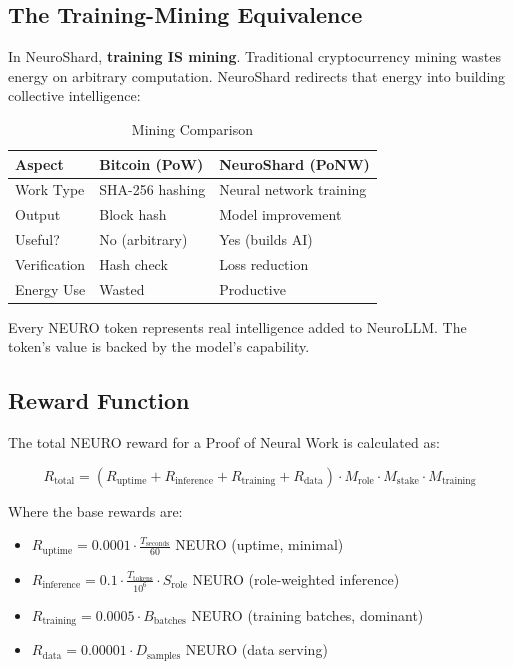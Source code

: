 \documentclass[11pt,a4paper]{article}
\begin{document}
\subsection{The Training-Mining Equivalence}

In NeuroShard, \textbf{training IS mining}. Traditional cryptocurrency mining wastes energy on arbitrary computation. NeuroShard redirects that energy into building collective intelligence:

\begin{table}[H]
\centering
\caption{Mining Comparison}
\begin{tabular}{@{}lll@{}}
\toprule
\textbf{Aspect} & \textbf{Bitcoin (PoW)} & \textbf{NeuroShard (PoNW)} \\
\midrule
Work Type & SHA-256 hashing & Neural network training \\
Output & Block hash & Model improvement \\
Useful? & No (arbitrary) & Yes (builds AI) \\
Verification & Hash check & Loss reduction \\
Energy Use & Wasted & Productive \\
\bottomrule
\end{tabular}
\end{table}

Every NEURO token represents real intelligence added to NeuroLLM. The token's value is backed by the model's capability.

\subsection{Reward Function}

The total NEURO reward for a Proof of Neural Work is calculated as:

\begin{equation}
R_{\text{total}} = \left( R_{\text{uptime}} + R_{\text{inference}} + R_{\text{training}} + R_{\text{data}} \right) \cdot M_{\text{role}} \cdot M_{\text{stake}} \cdot M_{\text{training}}
\end{equation}

Where the base rewards are:
\begin{itemize}
    \item $R_{\text{uptime}} = 0.0001 \cdot \frac{T_{\text{seconds}}}{60}$ NEURO (uptime, minimal)
    \item $R_{\text{inference}} = 0.1 \cdot \frac{T_{\text{tokens}}}{10^6} \cdot S_{\text{role}}$ NEURO (role-weighted inference)
    \item $R_{\text{training}} = 0.0005 \cdot B_{\text{batches}}$ NEURO (training batches, dominant)
    \item $R_{\text{data}} = 0.00001 \cdot D_{\text{samples}}$ NEURO (data serving)
\end{itemize}
\end{document}
